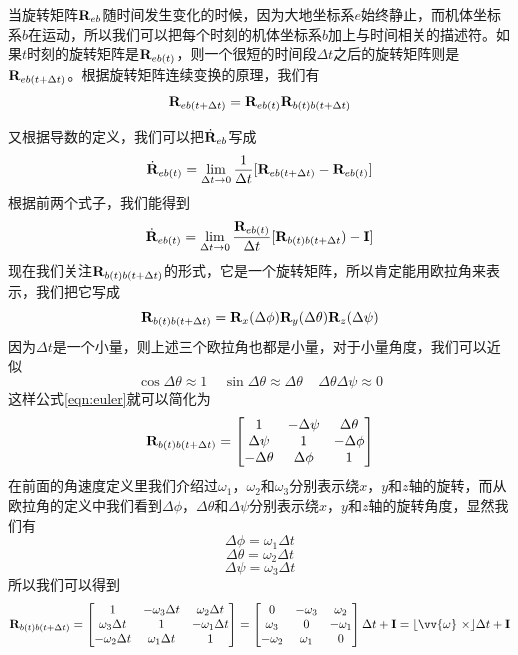 \documentclass[11pt]{article}
\begin{document}
当旋转矩阵${\bf R}_{eb}$随时间发生变化的时候，因为大地坐标系$e$始终静止，而机体坐标系$b$在运动，所以我们可以把每个时刻的机体坐标系$b$加上与时间相关的描述符。如果$t$时刻的旋转矩阵是${\bf R}_{eb(t)}$，则一个很短的时间段$\Delta t$之后的旋转矩阵则是${\bf R}_{eb(t+\Delta t)}$。根据旋转矩阵连续变换的原理，我们有
\begin{equation}\label{eqn:discreterot}
{\bf R}_{eb(t+\Delta t)} = {\bf R}_{eb(t)}{\bf R}_{b(t)b(t+\Delta t)}
\end{equation}

又根据导数的定义，我们可以把$\dot{{\bf R}}_{eb}$写成
$$
\dot{{\bf R}}_{eb(t)} = \lim_{\Delta t \to 0}\frac{1}{\Delta t}[{\bf R}_{eb(t+\Delta t)} - {\bf R}_{eb(t)}]
$$
根据前两个式子，我们能得到
$$
\dot{{\bf R}}_{eb(t)} = \lim_{\Delta t \to 0}\frac{{\bf R}_{eb(t)}}{\Delta t}[{\bf R}_{b(t)b(t+\Delta t}) - {\bf I}]
$$
现在我们关注${\bf R}_{b(t)b(t+\Delta t)}$的形式，它是一个旋转矩阵，所以肯定能用欧拉角来表示，我们把它写成
$$
{\bf R}_{b(t)b(t+\Delta t)} = {\bf R}_x(\Delta\phi){\bf R}_y(\Delta\theta){\bf R}_z(\Delta\psi)
$$
因为$\Delta t$是一个小量，则上述三个欧拉角也都是小量，对于小量角度，我们可以近似
$$
\cos\Delta\theta \approx 1 \ \ \ \ \ \sin\Delta\theta \approx \Delta\theta \ \ \ \ \ \Delta\theta\Delta\psi \approx 0
$$
这样公式\ref{eqn:euler}就可以简化为
$$
{\bf R}_{b(t)b(t+\Delta t)} =
\begin{bmatrix}
1 & -\Delta\psi & \Delta\theta\\
\Delta\psi & 1 & -\Delta\phi \\
-\Delta\theta & \Delta\phi & 1
\end{bmatrix} 
$$
在前面的角速度定义里我们介绍过$\omega_1$，$\omega_2$和$\omega_3$分别表示绕$x$，$y$和$z$轴的旋转，而从欧拉角的定义中我们看到$\Delta\phi$，$\Delta\theta$和$\Delta\psi$分别表示绕$x$，$y$和$z$轴的旋转角度，显然我们有
$$
\Delta\phi = \omega_1\Delta t
$$
$$
\Delta\theta = \omega_2\Delta t
$$
$$
\Delta\psi = \omega_3\Delta t
$$
所以我们可以得到
$$
{\bf R}_{b(t)b(t+\Delta t)} =
\begin{bmatrix}
1 & -\omega_3\Delta t & \omega_2\Delta t\\
\omega_3\Delta t & 1 & -\omega_1\Delta t \\
-\omega_2\Delta t & \omega_1\Delta t & 1
\end{bmatrix} 
= 
\begin{bmatrix}
0 & -\omega_3 & \omega_2\\
\omega_3 & 0 & -\omega_1 \\
-\omega_2 & \omega_1 & 0
\end{bmatrix}\Delta t + {\bf I} 
=
\lfloor \vv{\omega} \ \times \rfloor \Delta t + {\bf I} 
$$
\end{document}
